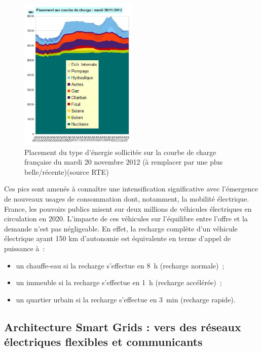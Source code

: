 \begin{figure}[!htbp]
 \begin{center}
  \includegraphics[width=0.5\textwidth]{images/problematique/ccharge.jpg}
 \end{center}
 \caption{Placement du type d'énergie sollicitée sur la courbe de charge française du mardi 20 novembre 2012 (à remplacer par une plus belle/récente)(source RTE)}
 \label{fig:courbeCharge}
\end{figure}

Ces pics sont amenés à connaître une intensification significative avec l'émergence de nouveaux usages de consommation dont, notamment, la mobilité électrique. France, les pouvoirs publics misent sur deux millions de véhicules électriques en circulation en 2020. L'impacte de ces véhicules sur l'équilibre entre l'offre et la demande n'est pas négligeable. En effet, la recharge complète d'un véhicule électrique ayant 150 km d'autonomie est équivalente en terme d'appel de puissance à~:
\begin{itemize}
\item un chauffe-eau si la recharge s'effectue en 8~h (recharge normale)~;
\item un immeuble si la recharge s'effectue en 1~h (recharge accélérée)~;
\item un quartier urbain si la recharge s'effectue en 3~min (recharge rapide).
\end{itemize}



\subsection{Architecture Smart Grids : vers des réseaux électriques flexibles et communicants}

